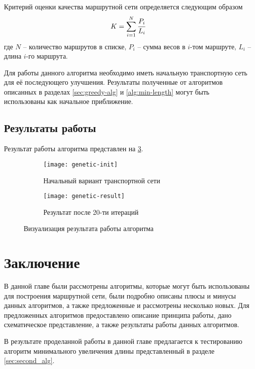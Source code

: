 \clearpage

Критерий оценки качества маршрутной сети определяется следующим образом
\[
    K = \sum\limits_{i=1}^{N} \cfrac{P_i}{L_i}
\]
где \( N \) -- количество маршрутов в списке, \( P_i \) -- сумма весов в \( i \)-том маршруте, 
\( L_i \) – длина \( i \)-го маршрута.

Для работы данного алгоритма необходимо иметь начальную транспортную сеть для её последующего улучшения. 
Результаты полученные от алгоритмов описанных в разделах \ref{sec:greedy-alg} и \ref{alg:min-length} могут 
быть использованы как начальное приближение.

\clearpage

\subsection{Результаты работы}
Результат работы алгоритма представлен на \ref{img:genetic-01}.
\begin{figure}[h!]
    \centering
    \begin{subfigure}{0.7\textwidth}
        \texttt{[image: genetic-init]}
        \caption{Начальный вариант транспортной сети}
        \label{fig:genetic-init}
    \end{subfigure}
    \begin{subfigure}{0.7\textwidth}
        \texttt{[image: genetic-result]}
        \caption{Результат после 20-ти итераций}
        \label{fig:genetic-result}
    \end{subfigure}
    \caption{Визуализация результата работы алгоритма}
    \label{img:genetic-01}
\end{figure}

\clearpage

\section{Заключение}
В данной главе были рассмотрены алгоритмы, которые могут быть использованы для построения маршрутной сети, 
были подробно описаны плюсы и минусы данных алгоритмов, а также предложенные и рассмотрены несколько новых. 
Для предложенных алгоритмов предоставлено описание принципа работы, дано схематическое представление, а также 
результаты работы данных алгоритмов. 

В результате проделанной работы в данной главе предлагается к тестированию алгоритм минимального увеличения 
длины представленный в разделе \ref{sec:second_alg}.